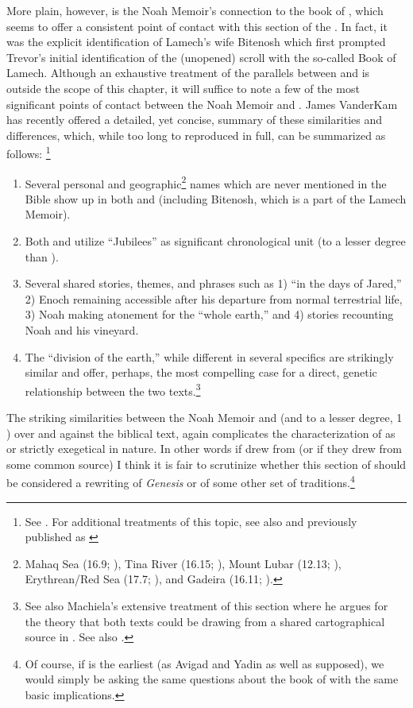 More plain, however, is the Noah Memoir's connection to the book of \jub, which seems to offer a consistent point of contact with this section of the \ga.\autocite[20]{fitzmyer2004} In fact, it was the explicit identification of Lamech's wife Bitenosh which first prompted Trevor's initial identification of the (unopened) scroll with the so-called Book of Lamech.\autocite{trevor_basor1949} Although an exhaustive treatment of the parallels between \jub and \ga is outside the scope of this chapter, it will suffice to note a few of the most significant points of contact between the Noah Memoir and \jub. James VanderKam has recently offered a detailed, yet concise, summary of these similarities and differences, which, while too long to reproduced in full, can be summarized as follows:%
\footnote{See \cite[374--376]{vanderkam_feldman-etal2017}. For additional treatments of this topic, see also \cite{machiela2009} and \cite[305--342]{kugel2012} previously published as \cite{kugel_roitman-etal2011}} 

\begin{enumerate}
    \item Several personal and geographic\footnote{%
        Mahaq Sea (16.9; ), Tina River (16.15; ), Mount Lubar (12.13; ), Erythrean/Red Sea (17.7; ), and Gadeira (16.11; ).}%
        names which are never mentioned in the Bible show up in both \ga and \jub (including Bitenosh, which is a part of the Lamech Memoir).
    \item Both \jub and \ga utilize ``Jubilees'' as significant chronological unit (\ga to a lesser degree than \jub).
    \item Several shared stories, themes, and phrases such as 1) ``in the days of Jared,'' 2) Enoch remaining accessible after his departure from normal terrestrial life, 3) Noah making atonement for the ``whole earth,'' and 4) stories recounting Noah and his vineyard.
    \item The ``division of the earth,'' while different in several specifics are strikingly similar and offer, perhaps, the most compelling case for a direct, genetic relationship between the two texts.\footnote{See also Machiela's extensive treatment of this section where he argues for the theory that both texts could be drawing from a shared cartographical source in \cite*[105--130]{machiela2009}. See also \cite{alexander_jjs1982}.}
\end{enumerate}

The striking similarities between the Noah Memoir and \jub  (and to a lesser degree, 1 \enoch) over and against the biblical text, again complicates the characterization of \ga as \rwb or strictly exegetical in nature. In other words if \ga drew from \jub (or if they drew from some common source) I think it is fair to scrutinize whether this section of \ga should be considered a rewriting of \emph{Genesis} or of some other set of traditions.\footnote{Of course, if \ga is the earliest (as Avigad and Yadin as well as \vermes supposed), we would simply be asking the same questions about the book of \jub with the same basic implications.}

